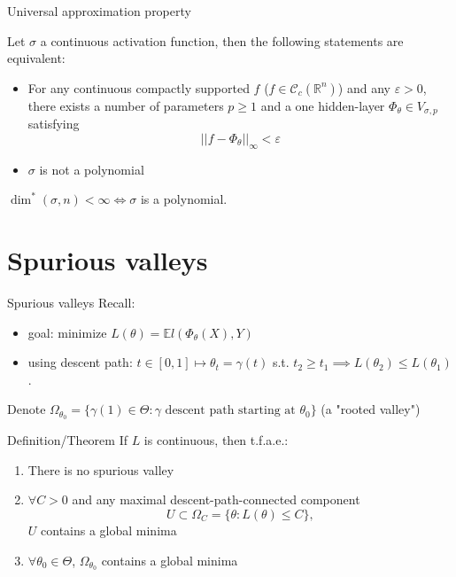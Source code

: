 \documentclass{beamer}
\begin{document}
\begin{frame}{Universal approximation property}
	\begin{theorem}
		Let $\sigma$ a continuous activation function, then the following statements are equivalent:
			\begin{itemize}
				\item For any continuous compactly supported $f$ ($f\in \mathcal{C}_c(\mathbb{R}^n)$) and any $\varepsilon>0$, there exists a number of parameters $p\geq 1$ and a one hidden-layer $\Phi_\theta \in V_{\sigma,p}$ satisfying
					\begin{equation*}
						||f-\Phi_\theta||_\infty < \varepsilon
					\end{equation*}
				\item $\sigma$ is not a polynomial
			\end{itemize}
	\end{theorem}

	
	\begin{corollary}
		$\dim^*(\sigma, n) < \infty \iff \sigma$ is a polynomial.
	\end{corollary}


\end{frame}


\section{Spurious valleys}
\begin{frame}{Spurious valleys}
	Recall:
	\begin{itemize}
		\item goal: minimize $L(\theta) = \mathbb{E} l(\Phi_\theta(X), Y)$
		\item using descent path: $t\in [0,1] \mapsto \theta_t = \gamma(t)$ s.t. $t_2\geq t_1 \implies L(\theta_2) \leq L(\theta_1)$.
	\end{itemize}
	Denote $\Omega_{\theta_0} =\{ \gamma(1) \in \Theta: \gamma \text{ descent path starting at $\theta_0$}\}$ (a "rooted valley")
	\begin{block}{Definition/Theorem}
		If $L$ is continuous, then t.f.a.e.:
		\begin{enumerate}
			\item There is no spurious valley
			\item $\forall C>0$ and any maximal descent-path-connected component $$U\subset \Omega_C=\{\theta : L(\theta) \leq C\},$$ $U$ contains a global minima
			\item $\forall \theta_0 \in \Theta$, $\Omega_{\theta_0}$ contains a global minima
		\end{enumerate}
	\end{block}
\end{frame}
\end{document}
